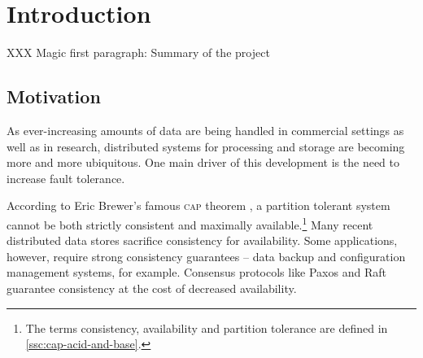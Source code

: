 \documentclass[11pt,chapterprefix=true,toc=bibliography,numbers=noendperiod,
               footnotes=multiple,twoside]{scrreprt}
\begin{document}
\chapter{Introduction\label{ch:introduction}}


XXX Magic first paragraph: Summary of the project



\section{Motivation\label{sc:motivation}}

As ever-increasing amounts of data are being handled in commercial settings as well as in research, distributed systems for processing and storage are becoming more and more ubiquitous. One main driver of this development is the need to increase fault tolerance.

According to Eric Brewer's famous \textsc{cap} theorem \autocite{cap}, a partition tolerant system cannot be both strictly consistent and maximally available.\footnote{The terms consistency, availability and partition tolerance are defined in \autoref{ssc:cap-acid-and-base}.} Many recent distributed data stores sacrifice consistency for availability. Some applications, however, require strong consistency guarantees -- data backup and configuration management systems, for example. Consensus protocols like Paxos \autocite{paxos} and Raft \autocite{raft} guarantee consistency at the cost of decreased availability.
\end{document}
